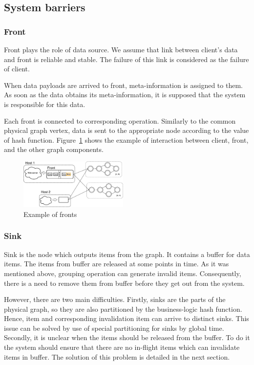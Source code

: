 \subsection{System barriers}

\subsubsection{Front}
Front plays the role of data source. We assume that link between client's data and front is reliable and stable. The failure of this link is considered as the failure of client.

When data payloads are arrived to front, meta-information is assigned to them. As soon as the data obtains its meta-information, it is supposed that the system is responsible for this data. 

Each front is connected to corresponding operation. Similarly to the common physical graph vertex, data is sent to the appropriate node according to the value of hash function. Figure~\ref{front-figure} shows the example of interaction between client, front, and the other graph components.

\begin{figure}[htbp]
  \centering
  \includegraphics[width=0.48\textwidth]{pics/front}
  \caption{Example of fronts}
  \label {front-figure}
\end{figure}

\subsubsection{Sink}
Sink is the node which outputs items from the graph. It contains a buffer for data items. The items from buffer are released at some points in time. As it was mentioned above, grouping operation can generate invalid items. Consequently, there is a need to remove them from buffer before they get out from the system.  

However, there are two main difficulties. Firstly, sinks are the parts of the physical graph, so they are also partitioned by the business-logic hash function. Hence, item and corresponding invalidation item can arrive to distinct sinks. This issue can be solved by use of special partitioning for sinks by global time. Secondly, it is unclear when the items should be released from the buffer. To do it the system should ensure that there are no in-flight items which can invalidate items in buffer. The solution of this problem is detailed in the next section. 

